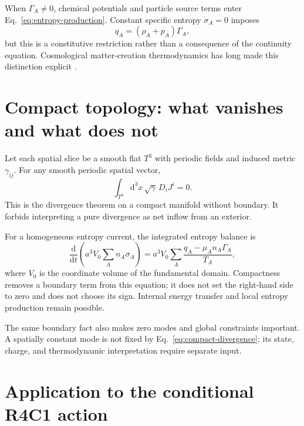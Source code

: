 \documentclass[aps,prd,reprint,superscriptaddress,nofootinbib,floatfix]{revtex4-2}
\newcommand{\Tthree}{T^{3}}
\newcommand{\dd}{\mathrm{d}}
\begin{document}
When \(\Gamma_A\neq0\), chemical potentials and particle source terms enter
Eq.~\eqref{eq:entropy-production}.  Constant specific entropy
\(\dot\sigma_A=0\) imposes
\begin{equation}
 q_A=(\rho_A+p_A)\Gamma_A,
 \label{eq:adiabatic-creation}
\end{equation}
but this is a constitutive restriction rather than a consequence of the
continuity equation.  Cosmological matter-creation thermodynamics has long
made this distinction explicit \cite{prigogine1988,calvao_lima_waga}.

\section{Compact topology: what vanishes and what does not}
\label{sec:topology}

Let each spatial slice be a smooth flat \(\Tthree\) with periodic fields and
induced metric \(\gamma_{ij}\).  For any smooth periodic spatial vector,
\begin{equation}
 \int_{\Tthree}\dd^3x\,\sqrt{\gamma}\,D_iJ^i=0.
 \label{eq:compact-divergence}
\end{equation}
This is the divergence theorem on a compact manifold without boundary.  It
forbids interpreting a pure divergence as net inflow from an exterior.

For a homogeneous entropy current, the integrated entropy balance is
\begin{equation}
 \frac{\dd}{\dd t}
 \left(a^3V_0\sum_A n_A\sigma_A\right)
 =a^3V_0\sum_A
 \frac{q_A-\mu_An_A\Gamma_A}{T_A},
 \label{eq:integrated-entropy}
\end{equation}
where \(V_0\) is the coordinate volume of the fundamental domain.  Compactness
removes a boundary term from this equation; it does not set the right-hand
side to zero and does not choose its sign.  Internal energy transfer and local
entropy production remain possible.

The same boundary fact also makes zero modes and global constraints important.
A spatially constant mode is not fixed by Eq.~\eqref{eq:compact-divergence};
its state, charge, and thermodynamic interpretation require separate input.

\section{Application to the conditional R4C1 action}
\label{sec:r4c1}
\end{document}
